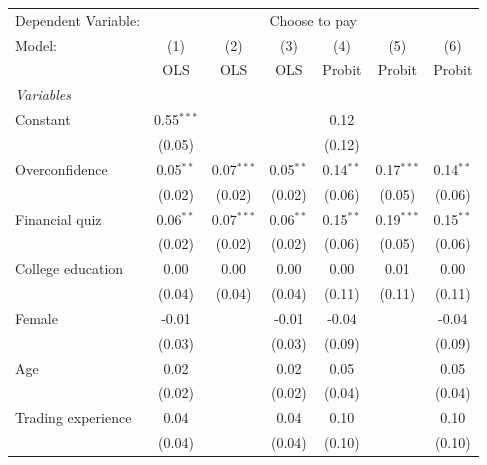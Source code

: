\begingroup
\centering
\begin{tabular}{lcccccc}
   \tabularnewline \midrule \midrule
   Dependent Variable: & \multicolumn{6}{c}{Choose to pay}\\
   Model:             & (1)          & (2)          & (3)         & (4)         & (5)          & (6)\\  
                      &  OLS         & OLS          & OLS         & Probit      & Probit       & Probit\\  
   \midrule
   \emph{Variables}\\
   Constant           & 0.55$^{***}$ &              &             & 0.12        &              &   \\   
                      & (0.05)       &              &             & (0.12)      &              &   \\   
   Overconfidence     & 0.05$^{**}$  & 0.07$^{***}$ & 0.05$^{**}$ & 0.14$^{**}$ & 0.17$^{***}$ & 0.14$^{**}$\\   
                      & (0.02)       & (0.02)       & (0.02)      & (0.06)      & (0.05)       & (0.06)\\   
   Financial quiz     & 0.06$^{**}$  & 0.07$^{***}$ & 0.06$^{**}$ & 0.15$^{**}$ & 0.19$^{***}$ & 0.15$^{**}$\\   
                      & (0.02)       & (0.02)       & (0.02)      & (0.06)      & (0.05)       & (0.06)\\   
   College education  & 0.00         & 0.00         & 0.00        & 0.00        & 0.01         & 0.00\\   
                      & (0.04)       & (0.04)       & (0.04)      & (0.11)      & (0.11)       & (0.11)\\   
   Female             & -0.01        &              & -0.01       & -0.04       &              & -0.04\\   
                      & (0.03)       &              & (0.03)      & (0.09)      &              & (0.09)\\   
   Age                & 0.02         &              & 0.02        & 0.05        &              & 0.05\\   
                      & (0.02)       &              & (0.02)      & (0.04)      &              & (0.04)\\   
   Trading experience & 0.04         &              & 0.04        & 0.10        &              & 0.10\\   
                      & (0.04)       &              & (0.04)      & (0.10)      &              & (0.10)\\   

\end{tabular}
